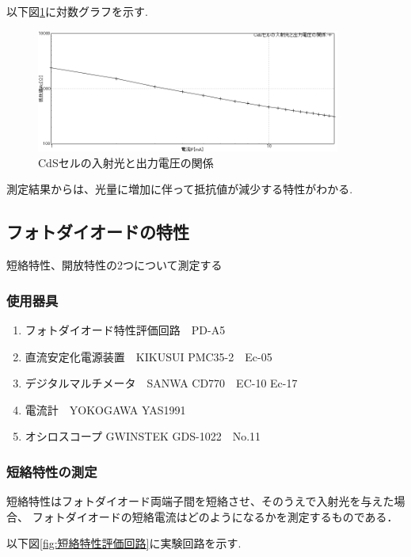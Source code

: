 \documentclass[titlepage]{jarticle}
\begin{document}
以下図\ref{fig:CdSセルの入射光と出力電圧の関係}に対数グラフを示す.
\begin{figure}[H]
    \begin{center}
        \includegraphics[width=10cm]{graph/1.PNG}
        \caption{CdSセルの入射光と出力電圧の関係}
        \label{fig:CdSセルの入射光と出力電圧の関係}
    \end{center}
\end{figure}

測定結果からは、光量に増加に伴って抵抗値が減少する特性がわかる.

\subsection{フォトダイオードの特性}
短絡特性、開放特性の2つについて測定する
\subsubsection{使用器具}
\begin{enumerate}
    \item フォトダイオード特性評価回路　PD-A5
    \item 直流安定化電源装置　KIKUSUI PMC35-2　Ec-05
    \item デジタルマルチメータ　SANWA CD770　EC-10 Ec-17
    \item 電流計　YOKOGAWA YAS1991
    \item オシロスコープ GWINSTEK  GDS-1022　No.11
\end{enumerate}
\subsubsection{短絡特性の測定}
短絡特性はフォトダイオード両端子間を短絡させ、そのうえで入射光を与えた場合、
フォトダイオードの短絡電流はどのようになるかを測定するものである．

以下図\ref{fig:短絡特性評価回路}に実験回路を示す.
\end{document}
